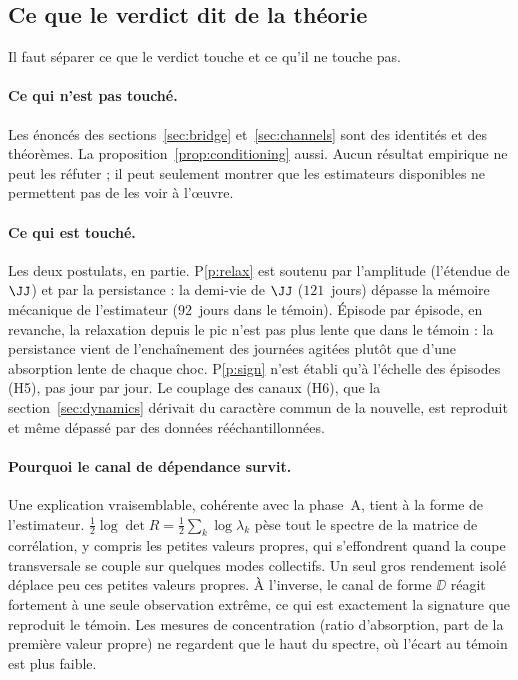 \subsection{Ce que le verdict dit de la théorie}

Il faut séparer ce que le verdict touche et ce qu'il ne touche pas.

\paragraph{Ce qui n'est pas touché.} Les énoncés des
sections~\ref{sec:bridge} et~\ref{sec:channels} sont des identités et des
théorèmes. La proposition~\ref{prop:conditioning} aussi. Aucun résultat empirique
ne peut les réfuter ; il peut seulement montrer que les estimateurs disponibles
ne permettent pas de les voir à l'\oe uvre.

\paragraph{Ce qui est touché.} Les deux postulats, en partie. P\ref{p:relax}
est soutenu par l'amplitude (l'étendue de $\JJ$) et par la persistance : la
demi-vie de $\JJ$ ($121$~jours) dépasse la mémoire mécanique de l'estimateur
($92$~jours dans le témoin). Épisode par épisode, en revanche, la relaxation
depuis le pic n'est pas plus lente que dans le témoin : la persistance vient de
l'enchaînement des journées agitées plutôt que d'une absorption lente de chaque
choc. P\ref{p:sign} n'est établi qu'à l'échelle des épisodes (H5), pas jour par
jour. Le couplage des canaux (H6), que la
section~\ref{sec:dynamics} dérivait du caractère commun de la nouvelle, est
reproduit et même dépassé par des données rééchantillonnées.

\paragraph{Pourquoi le canal de dépendance survit.} Une explication
vraisemblable, cohérente avec la phase~A, tient à la forme de l'estimateur.
$\tfrac12\log\det R=\tfrac12\sum_k\log\lambda_k$ pèse tout le spectre de la
matrice de corrélation, y compris les petites valeurs propres, qui s'effondrent
quand la coupe transversale se couple sur quelques modes collectifs. Un seul
gros rendement isolé déplace peu ces petites valeurs propres. À l'inverse, le
canal de forme $\DD$ réagit fortement à une seule observation extrême, ce qui
est exactement la signature que reproduit le témoin. Les mesures de
concentration (ratio d'absorption, part de la première valeur propre) ne
regardent que le haut du spectre, où l'écart au témoin est plus faible.

